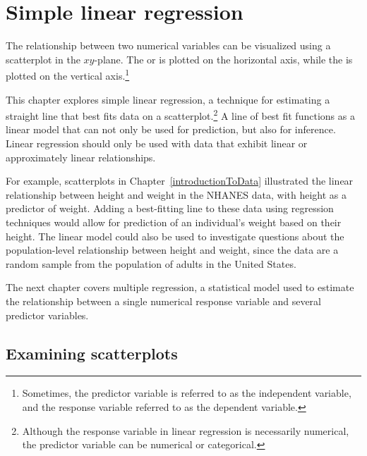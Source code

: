 
\chapter{Simple linear regression}
\label{linRegrForTwoVar}



The relationship between two numerical variables can be visualized using a scatterplot in the $xy$-plane. The  or  is plotted on the horizontal axis, while the  is plotted on the vertical axis.\footnote{Sometimes, the predictor variable is referred to as the independent variable, and the response variable referred to as the dependent variable.} 

This chapter explores simple linear regression, a technique for estimating a straight line that best fits data on a scatterplot.\footnote{Although the response variable in linear regression is necessarily numerical, the predictor variable can be numerical or categorical.} A line of best fit functions as a linear model that can not only be used for prediction, but also for inference. Linear regression should only be used with data that exhibit linear or approximately linear relationships.

For example, scatterplots in Chapter~\ref{introductionToData} illustrated the linear relationship between height and weight in the NHANES data, with height as a predictor of weight. Adding a best-fitting line to these data using regression techniques would allow for prediction of an individual's weight based on their height. The linear model could also be used to investigate questions about the population-level relationship between height and weight, since the data are a random sample from the population of adults in the United States. 

The next chapter covers multiple regression, a statistical model used to estimate the relationship between a single numerical response variable and several predictor variables.


\section{Examining scatterplots}
\label{examiningScatterPlots}

